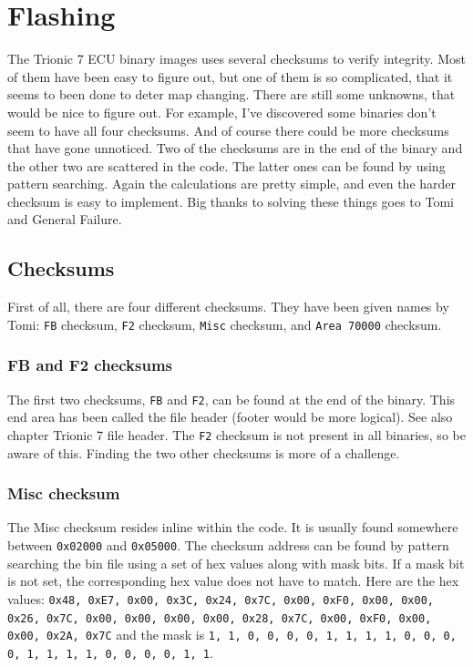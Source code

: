 \documentclass[11pt,a4paper]{book}
\begin{document}
\chapter{Flashing}
The Trionic 7 ECU binary images uses several checksums to verify integrity. Most
of them have been easy to figure out, but one of them is so complicated, that it
seems to been done to deter map changing. There are still some unknowns, that
would be nice to figure out. For example, I've discovered some binaries don't
seem to have all four checksums. And of course there could be more checksums
that have gone unnoticed. Two of the checksums are in the end of the binary and
the other two are scattered in the code. The latter ones can be found by using
pattern searching. Again the calculations are pretty simple, and even the harder
checksum is easy to implement. Big thanks to solving these things goes to Tomi
and General Failure.

\section{Checksums}
First of all, there are four different checksums. They have been given names by
Tomi: \texttt{FB} checksum,
\texttt{F2} checksum,
\texttt{Misc} checksum, and \texttt{Area 70000}
checksum.


\subsection{FB and F2 checksums}\label{sec:FBF2Checksum}
The first two checksums, \texttt{FB} and \texttt{F2}, can be found at the end of the binary. This
end area has been called the file header (footer would be more logical). See
also chapter Trionic 7 file header. The \texttt{F2} checksum is not
present in all binaries, so be aware of this. Finding the two other checksums is
more of a challenge.

\subsection{Misc checksum}
The Misc checksum resides inline within the code. It is usually found somewhere
between \texttt{0x02000} and \texttt{0x05000}. The checksum address can be found by pattern
searching the bin file using a set of hex values along with mask bits. If a mask
bit is not set, the corresponding hex value does not have to match. Here are the
hex values: \texttt{0x48, 0xE7, 0x00, 0x3C, 0x24, 0x7C, 0x00, 0xF0, 0x00, 0x00,
    0x26, 0x7C, 0x00, 0x00, 0x00, 0x00, 0x28, 0x7C, 0x00, 0xF0, 0x00, 0x00,
    0x2A, 0x7C} and the mask is \texttt{1, 1, 0, 0, 0, 0, 1, 1, 1, 1, 0, 0, 0,
    0, 1, 1, 1, 1, 0, 0, 0, 0, 1, 1}.
\end{document}
